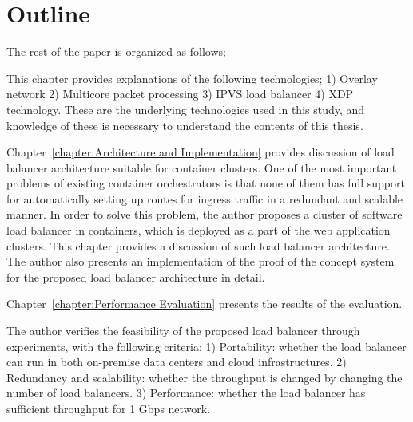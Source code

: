 \section{Outline}


The rest of the paper is organized as follows;


  This chapter provides explanations of the following technologies;
  1) Overlay network
  2) Multicore packet processing
  3) IPVS load balancer
  4) XDP technology.
  These are the underlying technologies used in this study, and knowledge of these is necessary to understand the contents of this thesis.




Chapter~\ref{chapter:Architecture and Implementation} provides discussion of load balancer architecture suitable for container clusters.
One of the most important problems of existing container orchestrators is that none of them has full support for automatically setting up routes for ingress traffic in a redundant and scalable manner.
In order to solve this problem, the author proposes a cluster of software load balancer in containers, which is deployed as a part of the web application clusters.
This chapter provides a discussion of such load balancer architecture.
The author also presents an implementation of the proof of the concept system for the proposed load balancer architecture in detail.

Chapter~\ref{chapter:Performance Evaluation} presents the results of the evaluation.

The author verifies the feasibility of the proposed load balancer through experiments, with the following criteria;
1) Portability: whether the load balancer can run in both on-premise data centers and cloud infrastructures.
2) Redundancy and scalability: whether the throughput is changed by changing the number of load balancers.
3) Performance: whether the load balancer has sufficient throughput for 1 Gbps network.



